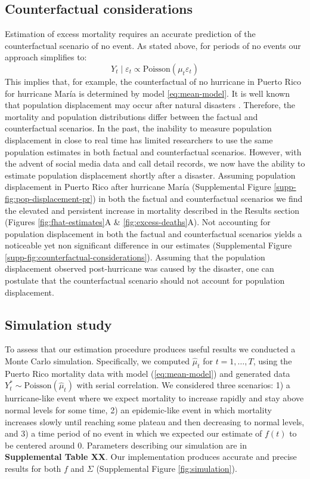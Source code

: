 \documentclass[11pt]{article}
\begin{document}
\subsection{Counterfactual considerations}
Estimation of excess mortality requires an accurate prediction of the counterfactual scenario of no event. As stated above, for periods of no events our approach simplifies to:
\begin{equation*}
    Y_t \mid \varepsilon_t \propto \mbox{Poisson}(\mu_t  \varepsilon_t )
\end{equation*}
This implies that, for example, the counterfactual of no hurricane in Puerto Rico for hurricane Mar\'ia is determined by model \ref{eq:mean-model}. It is well known that population displacement may occur after natural disasters \cite{mbaye2017climate, thomaz2013post, curtis2015recovery}. Therefore, the mortality and population distributions differ between the factual and counterfactual scenarios. In the past, the inability to measure population displacement in close to real time has limited researchers to use the same population estimates in both factual and counterfactual scenarios. However, with the advent of social media data and call detail records, we now have the ability to estimate population displacement shortly after a disaster. Assuming population displacement in Puerto Rico after hurricane Mar\'ia (Supplemental Figure \ref{supp-fig:pop-displacement-pr}) in both the factual and counterfactual scenarios we find the elevated and persistent increase in mortality described in the Results section (Figures \ref{fig:fhat-estimates}A \& \ref{fig:excess-deaths}A). Not accounting for population displacement in both the factual and counterfactual scenarios yields a noticeable yet non significant difference in our estimates (Supplemental Figure \ref{supp-fig:counterfactual-considerations}). Assuming that the population displacement observed post-hurricane was caused by the disaster, one can postulate that the counterfactual scenario should not account for population displacement. 

\subsection{Simulation study}
To assess that our estimation procedure produces useful results we conducted a Monte Carlo simulation. Specifically, we computed $\hat{\mu}_t$ for $t=1,\ldots, T$, using the Puerto Rico mortality data with model (\ref{eq:mean-model}) and generated data $Y_t^* \sim \mbox{Poisson}(\hat{\mu}_t)$ with serial correlation. We considered three scenarios: 1) a hurricane-like event where we expect mortality to increase rapidly and stay above normal levels for some time, 2) an epidemic-like event in which mortality increases slowly until reaching some plateau and then decreasing to normal levels, and 3) a time period of no event in which we expected our estimate of $f(t)$ to be centered around 0. Parameters describing our simulation are in \textbf{Supplemental Table XX}. Our implementation produces accurate and precise results for both $f$ and $\Sigma$ (Supplemental Figure \ref{fig:simulation}).
\end{document}
